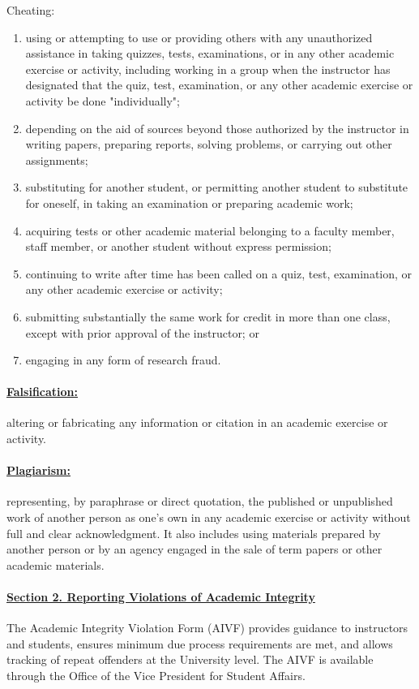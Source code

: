 \documentclass[10pt,fleqn]{article}
\begin{document}
\vskip0.1in\noindent
Cheating:
\vskip0.1in\noindent
\begin{enumerate}
  \item using or attempting to use or providing others with any unauthorized
        assistance in taking quizzes, tests, examinations, or in any other
        academic exercise or activity, including working in a group when the
        instructor has designated that the quiz, test, examination, or any other
        academic exercise or activity be done "individually";
  \item depending on the aid of sources beyond those authorized by the
        instructor in writing papers, preparing reports, solving problems, or
        carrying out other assignments;
  \item substituting for another student, or permitting another student to
        substitute for oneself, in taking an examination or preparing academic
        work;
  \item acquiring tests or other academic material belonging to a faculty
        member, staff member, or another student without express permission;
  \item continuing to write after time has been called on a quiz, test,
        examination, or any other academic exercise or activity;
  \item submitting substantially the same work for credit in more than one
        class, except with prior approval of the instructor; or
  \item engaging in any form of research fraud.
\end{enumerate}

\paragraph{\underline{Falsification:}} altering or fabricating any information
or citation in an academic exercise or activity.

\paragraph{\underline{Plagiarism:}} representing, by paraphrase or direct
quotation, the published or unpublished work of another person as one's own in
any academic exercise or activity without full and clear acknowledgment. It
also includes using materials prepared by another person or by an agency engaged
in the sale of term papers or other academic materials.

\paragraph{\underline{Section 2. Reporting Violations of Academic Integrity}}
The Academic Integrity Violation Form (AIVF) provides guidance to instructors
and students, ensures minimum due process requirements are met, and allows
tracking of repeat offenders at the University level. The AIVF is available
through the Office of the Vice President for Student Affairs.
\end{document}
